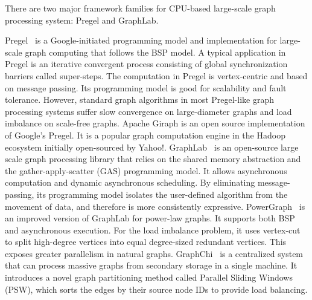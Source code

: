 \documentclass[format=acmsmall,review=false,screen=true]{acmart}
\begin{document}
There are two major framework families for CPU-based large-scale graph
processing system: Pregel and GraphLab.

Pregel~\cite{Malewicz:2010:PSL} is a Google-initiated programming
model and implementation for large-scale graph computing that follows
the BSP model. A typical application in Pregel is an iterative
convergent process consisting of global synchronization barriers
called super-steps. The computation in Pregel is vertex-centric and
based on message passing. Its programming model is good for
scalability and fault tolerance. However, standard graph algorithms in
most Pregel-like graph processing systems suffer slow convergence on
large-diameter graphs and load imbalance on scale-free graphs. Apache
Giraph is an open source implementation of Google's Pregel. It is a
popular graph computation engine in the Hadoop ecosystem initially
open-sourced by Yahoo!\@.
GraphLab~\cite{Low:2010:GAN} is an open-source large scale graph
processing library that relies on the shared memory abstraction and
the gather-apply-scatter (GAS) programming model. It allows
asynchronous computation and dynamic asynchronous scheduling. By
eliminating message-passing, its programming model isolates the
user-defined algorithm from the movement of data, and therefore is
more consistently expressive. PowerGraph~\cite{Gonzalez:2012:PDG} is
an improved version of GraphLab for power-law graphs. It supports both
BSP and asynchronous execution. For the load imbalance problem, it
uses vertex-cut to split high-degree vertices into equal degree-sized
redundant vertices. This exposes greater parallelism in natural
graphs. GraphChi~\cite{Kyrola:2012:GLG} is a centralized system that
can process massive graphs from secondary storage in a single machine.
It introduces a novel graph partitioning method called Parallel
Sliding Windows (PSW), which sorts the edges by their source node IDs
to provide load balancing.
\end{document}
